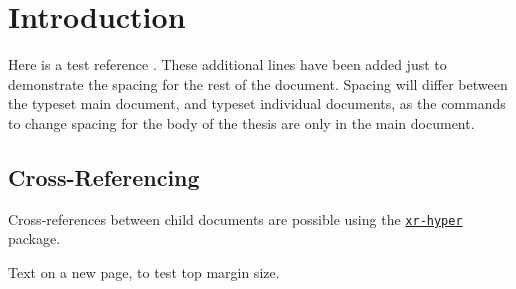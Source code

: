 \documentclass[\main/thesis.tex]{subfiles}
\begin{document}
\chapter{Introduction}

Here is a test reference \cite{Knuth68:art_of_programming}.
These additional lines have been added just to demonstrate the spacing
for the rest of the document. Spacing will differ between the typeset main
document, and typeset individual documents, as the commands
to change spacing for the body of the thesis are only in the main document.

\section{Cross-Referencing}\label{sec:crossRef}

Cross-references between child documents are possible using the
\href{https://ctan.org/pkg/xr-hyper}{\texttt{xr-hyper}} package.

\newpage

Text on a new page, to test top margin size.
\end{document}
